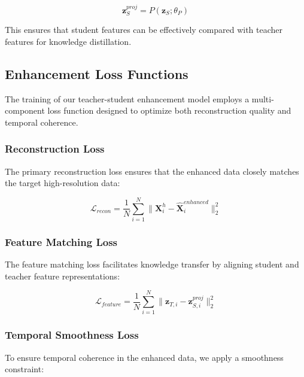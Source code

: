 \begin{equation}
\mathbf{z}_S^{proj} = P(\mathbf{z}_S; \theta_P)
\end{equation}

This ensures that student features can be effectively compared with teacher features for knowledge distillation.

\subsection{Enhancement Loss Functions}

\hspace{2em}The training of our teacher-student enhancement model employs a multi-component loss function designed to optimize both reconstruction quality and temporal coherence.

\subsubsection{Reconstruction Loss}

\hspace{2em}The primary reconstruction loss ensures that the enhanced data closely matches the target high-resolution data:

\begin{equation}
\mathcal{L}_{recon} = \frac{1}{N} \sum_{i=1}^{N} \|\mathbf{X}^h_i - \hat{\mathbf{X}}^{enhanced}_i\|_2^2
\end{equation}

\subsubsection{Feature Matching Loss}

\hspace{2em}The feature matching loss facilitates knowledge transfer by aligning student and teacher feature representations:

\begin{equation}
\mathcal{L}_{feature} = \frac{1}{N} \sum_{i=1}^{N} \|\mathbf{z}_{T,i} - \mathbf{z}_{S,i}^{proj}\|_2^2
\end{equation}

\subsubsection{Temporal Smoothness Loss}

\hspace{2em}To ensure temporal coherence in the enhanced data, we apply a smoothness constraint:

